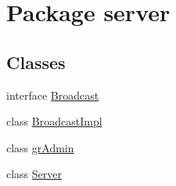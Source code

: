 \hypertarget{namespaceserver}{}\section{Package server}
\label{namespaceserver}
\subsection*{Classes}
\begin{DoxyCompactItemize}
\item 
interface \hyperlink{interfaceserver_1_1_broadcast}{Broadcast}
\item 
class \hyperlink{classserver_1_1_broadcast_impl}{Broadcast\+Impl}
\item 
class \hyperlink{classserver_1_1gr_admin}{gr\+Admin}
\item 
class \hyperlink{classserver_1_1_server}{Server}
\end{DoxyCompactItemize}

